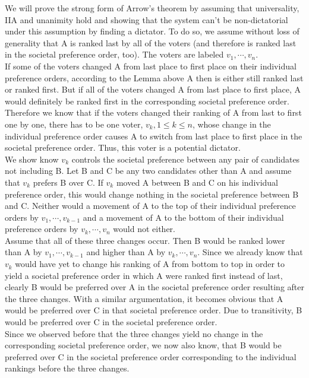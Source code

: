 We will prove the strong form of Arrow's theorem by assuming that universality, IIA and unanimity hold and showing that the system can't be non-dictatorial under this assumption by finding a dictator. To do so, we assume without loss of generality that A is ranked last by all of the voters (and therefore is ranked last in the societal preference order, too). The voters are labeled $v_1, \cdots, v_n$. \\
If some of the voters changed A from last place to first place on their individual preference orders, according to the Lemma above A then is either still ranked last or ranked first. But if all of the voters changed A from last place to first place, A would definitely be ranked first in the corresponding societal preference order. \\
Therefore we know that if the voters changed their ranking of A from last to first one by one, there has to be one voter, $v_k, 1\leq k \leq n$, whose change in the individual preference order causes A to switch from last place to first place in the societal preference order. Thus, this voter is a potential dictator. \\
We show know $v_k$ controls the societal preference between any pair of candidates not including B. 
Let B and C be any two candidates other than A and assume that $v_k$ prefers B over C. 
If $v_k$ moved A between B and C on his individual preference order, this would change nothing in the societal preference between B and C. Neither would a movement of A to the top of their individual preference orders by $v_1, \cdots, v_{k-1}$ and a movement of A to the bottom of their individual preference orders by $v_k, \cdots, v_n$ would not either. \\
Assume that all of these three changes occur. Then B would be ranked lower than A by $v_1, \cdots, v_{k-1}$ and higher than A by $v_k, \cdots, v_n$. Since we already know that $v_k$ would have yet to change his ranking of A from bottom to top in order to yield a societal preference order in which A were ranked first instead of last, clearly B would be preferred over A in the societal preference order resulting after the three changes. With a similar argumentation, it becomes obvious that A would be preferred over C in that societal preference order. Due to transitivity, B would be preferred over C in the societal preference order. \\
Since we observed before that the three changes yield no change in the corresponding societal preference order, we now also know, that B would be preferred over C in the societal preference order corresponding to the individual rankings before the three changes. \\


